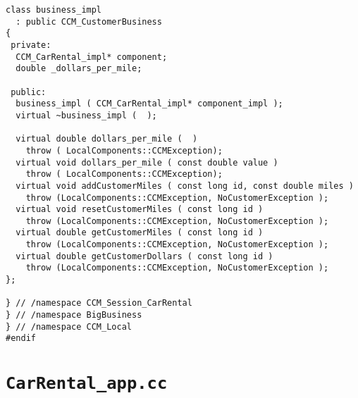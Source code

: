 \begin{scriptsize}
\begin{verbatim}
class business_impl
  : public CCM_CustomerBusiness
{
 private:
  CCM_CarRental_impl* component;
  double _dollars_per_mile; 

 public:
  business_impl ( CCM_CarRental_impl* component_impl );
  virtual ~business_impl (  );

  virtual double dollars_per_mile (  ) 
    throw ( LocalComponents::CCMException);
  virtual void dollars_per_mile ( const double value ) 
    throw ( LocalComponents::CCMException);
  virtual void addCustomerMiles ( const long id, const double miles ) 
    throw (LocalComponents::CCMException, NoCustomerException );
  virtual void resetCustomerMiles ( const long id ) 
    throw (LocalComponents::CCMException, NoCustomerException );
  virtual double getCustomerMiles ( const long id ) 
    throw (LocalComponents::CCMException, NoCustomerException );
  virtual double getCustomerDollars ( const long id ) 
    throw (LocalComponents::CCMException, NoCustomerException );
};

} // /namespace CCM_Session_CarRental
} // /namespace BigBusiness
} // /namespace CCM_Local
#endif
\end{verbatim}
\end{scriptsize}


\section{{\tt CarRental\_app.cc}}


